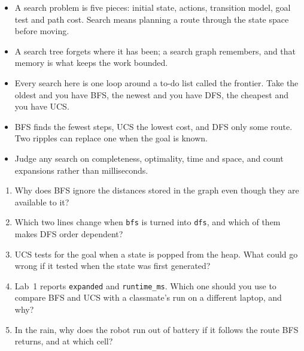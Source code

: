 \begin{chapterrecap}
\begin{itemize}
  \item A search problem is five pieces: initial state, actions, transition model, goal test and path cost. Search means planning a route through the state space before moving.
  \item A search tree forgets where it has been; a search graph remembers, and that memory is what keeps the work bounded.
  \item Every search here is one loop around a to-do list called the frontier. Take the oldest and you have BFS, the newest and you have DFS, the cheapest and you have UCS.
  \item BFS finds the fewest steps, UCS the lowest cost, and DFS only some route. Two ripples can replace one when the goal is known.
  \item Judge any search on completeness, optimality, time and space, and count expansions rather than milliseconds.
\end{itemize}
\end{chapterrecap}

\begin{quickcheck}
\begin{enumerate}
  \item Why does BFS ignore the distances stored in the graph even though they are available to it?
  \item Which two lines change when \texttt{bfs} is turned into \texttt{dfs}, and which of them makes DFS order dependent?
  \item UCS tests for the goal when a state is popped from the heap. What could go wrong if it tested when the state was first generated?
  \item Lab~1 reports \texttt{expanded} and \texttt{runtime\_ms}. Which one should you use to compare BFS and UCS with a classmate's run on a different laptop, and why?
  \item In the rain, why does the robot run out of battery if it follows the route BFS returns, and at which cell?
\end{enumerate}
\end{quickcheck}
